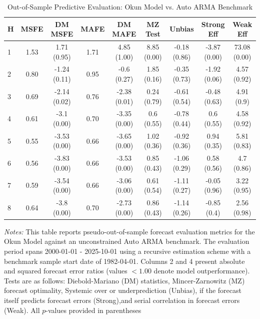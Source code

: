 \begin{table}[htbp]
\centering
\caption{Out-of-Sample Predictive Evaluation: Okun Model vs. Auto ARMA Benchmark}
\label{tab:okun_model_evaluation}
\footnotesize
\begin{tabular}{l cccccccc}
\hline\hline
\rule{0pt}{3ex}
\textbf{H} & \textbf{MSFE} & \textbf{DM MSFE} & \textbf{MAFE} & \textbf{DM MAFE} & \textbf{MZ Test} & \textbf{Unbias} & \textbf{Strong Eff} & \textbf{Weak Eff} \\[0.5ex]
\hline
\rule{0pt}{2.5ex}
1 & 1.53 & 1.71 (0.95) & 1.71 & 4.85 (1.00) & 8.85 (0.00) & -0.18 (0.86) & -3.87 (0.00) & 73.08 (0.00) \\
2 & 0.80 & -1.24 (0.11) & 0.95 & -0.6 (0.27) & 1.85 (0.16) & -0.35 (0.73) & -1.92 (0.06) & 4.57 (0.92) \\
3 & 0.69 & -2.14 (0.02) & 0.76 & -2.38 (0.01) & 0.24 (0.79) & -0.61 (0.54) & -0.48 (0.63) & 4.91 (0.9) \\
4 & 0.61 & -3.1 (0.00) & 0.70 & -3.35 (0.00) & 0.6 (0.55) & -0.78 (0.44) & 0.6 (0.55) & 4.58 (0.92) \\
5 & 0.55 & -3.53 (0.00) & 0.66 & -3.65 (0.00) & 1.02 (0.36) & -0.92 (0.36) & 0.94 (0.35) & 5.81 (0.83) \\
6 & 0.56 & -3.83 (0.00) & 0.66 & -3.53 (0.00) & 0.85 (0.43) & -1.06 (0.29) & 0.58 (0.56) & 4.7 (0.86) \\
7 & 0.59 & -3.54 (0.00) & 0.66 & -3.06 (0.00) & 0.61 (0.54) & -1.11 (0.27) & -0.05 (0.96) & 3.22 (0.95) \\
8 & 0.64 & -3.8 (0.00) & 0.70 & -2.73 (0.00) & 0.86 (0.43) & -1.14 (0.26) & -0.85 (0.4) & 2.56 (0.98) \\
\hline\hline
\end{tabular}%
\par\smallskip
\parbox{\textwidth}{\scriptsize \textit{Notes:} This table reports pseudo-out-of-sample forecast evaluation metrics for the Okun Model against an unconstrained Auto ARMA benchmark. The evaluation period spans 2000-01-01 - 2025-10-01 using a recursive estimation scheme with a benchmark sample start date of 1982-04-01. Columns 2 and 4 present absolute and squared forecast error ratios (values $< 1.00$ denote model outperformance). Tests are as follows: Diebold-Mariano (DM) statistics, Mincer-Zarnowitz (MZ) forecast optimality, Systemic over or underprediction (Unbias), if the forecast itself predicts forecast errors (Strong),and serial correlation in forecast errors (Weak). All $p$-values provided in parentheses}
\end{table}
